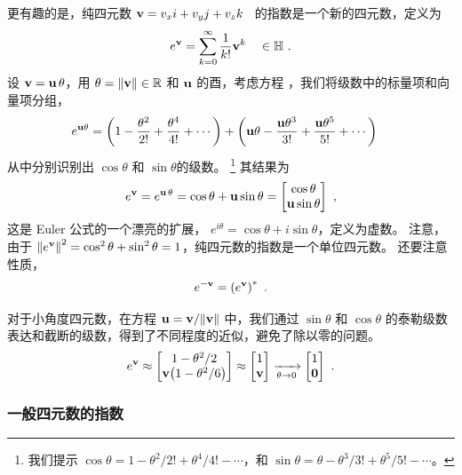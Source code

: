 更有趣的是，纯四元数 ${\bf v}=v_xi+v_yj+v_zk$~ 的指数是一个新的四元数，定义为
%
\begin{align}
e^{\bf v}
= \sum_{k=0}^\infty \frac{1}{k!}{\bf v}^k \quad \in {\mathbb H}
~.
\label{equ:pureQuatExpSeries}
\end{align}
%
设 ${\bf v}={\bf u}\,\theta$，用 $\theta={\left\|{\bf v}\right\|}\in{\mathbb R}$ 和 ${\bf u}$ 的酉，考虑方程  ，我们将级数中的标量项和向量项分组， 
%
\begin{align}
e^{{\bf u}\theta} 
&= \left(1-\frac{\theta^2}{2!}+\frac{\theta^4}{4!}+\cdots\right) + \left({\bf u}\theta - \frac{{\bf u}\theta^3}{3!}+\frac{{\bf u}\theta^5}{5!}+\cdots\right)
\end{align}
%
从中分别识别出 $\cos\theta$ 和 $\sin\theta$的级数。
% 
%
\footnote{我们提示 $\cos \theta = 1 - \theta^2/2! + \theta^4/4! - \cdots$，和 $\sin \theta =  \theta - \theta^3/3! + \theta^5/5! - \cdots$。}
%
其结果为
%
\begin{align}
e^{\bf v}
= e^{{\bf u}\,\theta} 
= \cos\theta + {\bf u}\sin\theta = \begin{bmatrix}
\cos\theta \\ {\bf u}\sin\theta 
\end{bmatrix} ~,
\label{equ:EulerFormulaQuat}
\end{align}
%
这是 Euler 公式的一个漂亮的扩展， $e^{i\theta}=\cos\theta+i\sin\theta$，定义为虚数。 
%
注意，由于 ${\left\|e^{{\bf v}}\right\|}^2=\cos^2\theta+\sin^2\theta=1$，纯四元数的指数是一个单位四元数。
还要注意性质，
%
\begin{align}
e^{-{\bf v}} = \left(e^{{\bf v}}\right)^*
~.
\end{align}

对于小角度四元数，在方程 ${\bf u}={\bf v}/{\left\|{\bf v}\right\|}$ 中，我们通过 $\sin\theta$ 和 $\cos\theta$ 的泰勒级数表达和截断的级数，得到了不同程度的近似，避免了除以零的问题。
%
\begin{align}
e^{\bf v} 
\approx
\begin{bmatrix}
1-\theta^2/2 \\ {\bf v}\big(1-\theta^2/6\big) 
\end{bmatrix}
\approx
\begin{bmatrix}
1 \\ {\bf v} 
\end{bmatrix}
\xrightarrow[\theta\to 0]{}
\begin{bmatrix}
1 \\ {\bf0}
\end{bmatrix}
~.
\end{align}
%


\subsubsection{一般四元数的指数}


